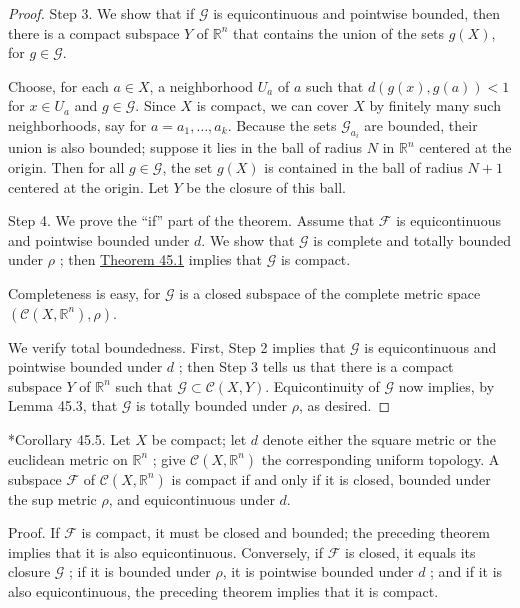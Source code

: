 \begin{proof}
Step 3. We show that if \(\mathcal{G}\) is equicontinuous and pointwise bounded, then there is a compact subspace \(Y\) of \(\mathbb{R}^{n}\) that contains the union of the sets \(g(X)\), for \(g \in \mathcal{G}\).

Choose, for each \(a \in X\), a neighborhood \(U_{a}\) of \(a\) such that \(d({g(x),g( a) }) < 1\) for \(x \in {U}_{a}\) and \(g \in \mathcal{G}\). Since \(X\) is compact, we can cover \(X\) by finitely many such neighborhoods, say for \(a = a_{1},\ldots ,a_{k}\). Because the sets \(\mathcal{G}_{a_{i}}\) are bounded, their union is also bounded; suppose it lies in the ball of radius \(N\) in \(\mathbb{R}^{n}\) centered at the origin. Then for all \(g \in \mathcal{G}\), the set \(g(X)\) is contained in the ball of radius \(N + 1\) centered at the origin. Let \(Y\) be the closure of this ball.

Step 4. We prove the ``if'' part of the theorem. Assume that \(\mathcal{F}\) is equicontinuous and pointwise bounded under \(d\). We show that \(\mathcal{G}\) is complete and totally bounded under \(\rho\) ; then \hyperref[thm:45.1]{Theorem 45.1} implies that \(\mathcal{G}\) is compact.

Completeness is easy, for \(\mathcal{G}\) is a closed subspace of the complete metric space \(({\mathcal{C}({X,\mathbb{R}^{n}}),\rho })\).

We verify total boundedness. First, Step 2 implies that \(\mathcal{G}\) is equicontinuous and pointwise bounded under \(d\) ; then Step 3 tells us that there is a compact subspace \(Y\) of \(\mathbb{R}^{n}\) such that \(\mathcal{G} \subset \mathcal{C}({X,Y})\). Equicontinuity of \(\mathcal{G}\) now implies, by Lemma 45.3, that \(\mathcal{G}\) is totally bounded under \(\rho\), as desired.
\end{proof}

*Corollary 45.5. Let \(X\) be compact; let \(d\) denote either the square metric or the euclidean metric on \(\mathbb{R}^{n}\) ; give \(\mathcal{C}({X,\mathbb{R}^{n}})\) the corresponding uniform topology. A subspace \(\mathcal{F}\) of \(\mathcal{C}({X,\mathbb{R}^{n}})\) is compact if and only if it is closed, bounded under the sup metric \(\rho\), and equicontinuous under \(d\).

Proof. If \(\mathcal{F}\) is compact, it must be closed and bounded; the preceding theorem implies that it is also equicontinuous. Conversely, if \(\mathcal{F}\) is closed, it equals its closure \(\mathcal{G}\) ; if it is bounded under \(\rho\), it is pointwise bounded under \(d\) ; and if it is also equicontinuous, the preceding theorem implies that it is compact.

